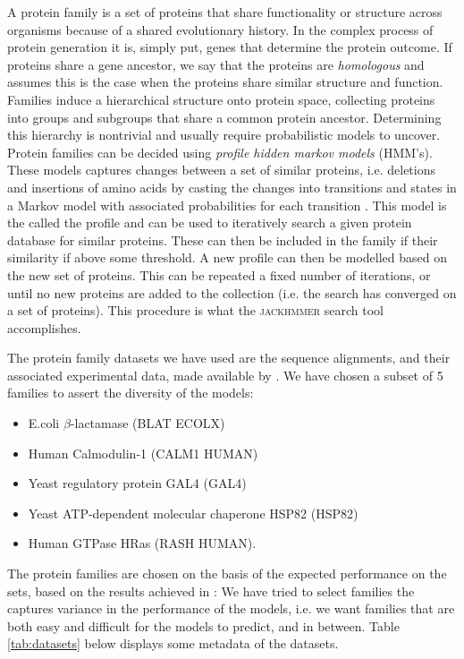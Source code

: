 A protein family is a set of proteins that share functionality or structure across organisms because of a shared evolutionary history. In the complex process of protein generation it is, simply put, genes that determine the protein outcome. If proteins share a gene ancestor, we say that the proteins are \textit{homologous} and assumes this is the case when the proteins share similar structure and function. Families induce a hierarchical structure onto protein space, collecting proteins into groups and subgroups that share a common protein ancestor. Determining this hierarchy is nontrivial and usually require probabilistic models to uncover. Protein families can be decided using \textit{profile hidden markov models} (HMM's). These models captures changes between a set of similar proteins, i.e. deletions and insertions of amino acids by casting the changes into transitions and states in a Markov model with associated probabilities for each transition \cite{eddy1998profile}. This model is the called the profile and can be used to iteratively search a given protein database for similar proteins. These can then be included in the family if their similarity if above some threshold. A new profile can then be modelled based on the new set of proteins. This can be repeated a fixed number of iterations, or until no new proteins are added to the collection (i.e. the search has converged on a set of proteins). This procedure is what the \textsc{jackhmmer} search tool accomplishes.

The protein family datasets we have used are the sequence alignments, and their associated experimental data, made available by \cite{riesselman2018deep}. We have chosen a subset of 5 families to assert the diversity of the models: 
\begin{itemize}
    \item E.coli $\beta$-lactamase (BLAT ECOLX)
    \item Human Calmodulin-1 (CALM1 HUMAN)
    \item Yeast regulatory protein GAL4 (GAL4)
    \item Yeast ATP-dependent molecular chaperone HSP82 (HSP82)
    \item Human GTPase HRas (RASH HUMAN).
\end{itemize}
The protein families are chosen on the basis of the expected performance on the sets, based on the results achieved in \cite{riesselman2018deep}: We have tried to select families the captures variance in the performance of the models, i.e. we want families that are both easy and difficult for the models to predict, and in between. Table \ref{tab:datasets} below displays some metadata of the datasets.

